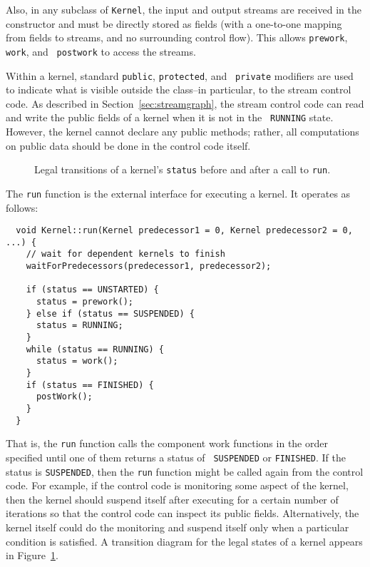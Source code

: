 Also, in any subclass of {\tt Kernel}, the input and output streams
are received in the constructor and must be directly stored as fields
(with a one-to-one mapping from fields to streams, and no surrounding
control flow).  This allows {\tt prework}, {\tt work}, and {\tt
postwork} to access the streams.

Within a kernel, standard {\tt public}, {\tt protected}, and {\tt
private} modifiers are used to indicate what is visible outside the
class--in particular, to the stream control code.  As described in
Section~\ref{sec:streamgraph}, the stream control code can read and
write the public fields of a kernel when it is not in the {\tt
RUNNING} state.  However, the kernel cannot declare any public
methods; rather, all computations on public data should be done in the
control code itself.


\begin{figure}[t]
\begin{center}
\end{center}
\vspace{-12pt}
\caption{Legal transitions of a kernel's {\tt status} before and after
a call to {\tt run}.\protect\label{fig:kernel-status}}
\end{figure}

The {\tt run} function is the external interface for executing a
kernel.  It operates as follows: 
{\small
\begin{verbatim}
  void Kernel::run(Kernel predecessor1 = 0, Kernel predecessor2 = 0, ...) {
    // wait for dependent kernels to finish
    waitForPredecessors(predecessor1, predecessor2);

    if (status == UNSTARTED) {
      status = prework();
    } else if (status == SUSPENDED) {
      status = RUNNING;
    }
    while (status == RUNNING) {
      status = work();
    }
    if (status == FINISHED) {
      postWork();
    }
  } 
\end{verbatim}}
That is, the {\tt run} function calls the component work functions in
the order specified until one of them returns a status of {\tt
SUSPENDED} or {\tt FINISHED}.  If the status is {\tt SUSPENDED}, then
the {\tt run} function might be called again from the control code.
For example, if the control code is monitoring some aspect of the
kernel, then the kernel should suspend itself after executing for a
certain number of iterations so that the control code can inspect its
public fields.  Alternatively, the kernel itself could do the
monitoring and suspend itself only when a particular condition is
satisfied.  A transition diagram for the legal states of a kernel
appears in Figure~\ref{fig:kernel-status}.

